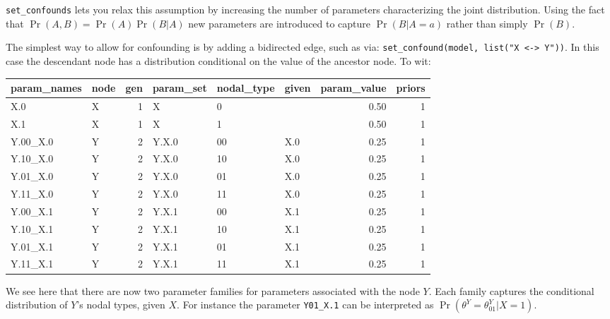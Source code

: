 \documentclass[
  12pt,
]{book}
\newenvironment{Shaded}{\begin{snugshade}}{\end{snugshade}}
\newcommand{\FunctionTok}[1]{\textcolor[rgb]{0.13,0.29,0.53}{\textbf{#1}}}
\newcommand{\NormalTok}[1]{#1}
\newcommand{\OtherTok}[1]{\textcolor[rgb]{0.56,0.35,0.01}{#1}}
\newcommand{\SpecialCharTok}[1]{\textcolor[rgb]{0.81,0.36,0.00}{\textbf{#1}}}
\newcommand{\StringTok}[1]{\textcolor[rgb]{0.31,0.60,0.02}{#1}}
\begin{document}
\texttt{set\_confounds} lets you relax this assumption by increasing the number of parameters characterizing the joint distribution. Using the fact that \(\Pr(A,B) = \Pr(A)\Pr(B|A)\) new parameters are introduced to capture \(\Pr(B|A=a)\) rather than simply \(\Pr(B)\).

The simplest way to allow for confounding is by adding a bidirected edge, such as via: \texttt{set\_confound(model,\ list("X\ \textless{}-\textgreater{}\ Y"))}. In this case the descendant node has a distribution conditional on the value of the ancestor node. To wit:

\begin{Shaded}
\end{Shaded}

\begin{tabular}{l|l|r|l|l|l|r|r}
\hline
param\_names & node & gen & param\_set & nodal\_type & given & param\_value & priors\\
\hline
X.0 & X & 1 & X & 0 &  & 0.50 & 1\\
\hline
X.1 & X & 1 & X & 1 &  & 0.50 & 1\\
\hline
Y.00\_X.0 & Y & 2 & Y.X.0 & 00 & X.0 & 0.25 & 1\\
\hline
Y.10\_X.0 & Y & 2 & Y.X.0 & 10 & X.0 & 0.25 & 1\\
\hline
Y.01\_X.0 & Y & 2 & Y.X.0 & 01 & X.0 & 0.25 & 1\\
\hline
Y.11\_X.0 & Y & 2 & Y.X.0 & 11 & X.0 & 0.25 & 1\\
\hline
Y.00\_X.1 & Y & 2 & Y.X.1 & 00 & X.1 & 0.25 & 1\\
\hline
Y.10\_X.1 & Y & 2 & Y.X.1 & 10 & X.1 & 0.25 & 1\\
\hline
Y.01\_X.1 & Y & 2 & Y.X.1 & 01 & X.1 & 0.25 & 1\\
\hline
Y.11\_X.1 & Y & 2 & Y.X.1 & 11 & X.1 & 0.25 & 1\\
\hline
\end{tabular}

We see here that there are now two parameter families for parameters associated with the node \(Y\). Each family captures the conditional distribution of \(Y\)'s nodal types, given \(X\). For instance the parameter \texttt{Y01\_X.1} can be interpreted as \(\Pr(\theta^Y = \theta^Y _{01} | X=1)\).
\end{document}
